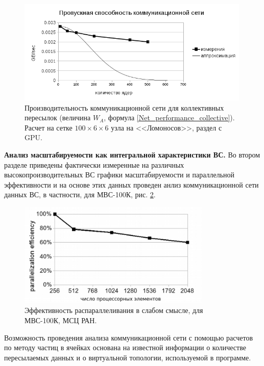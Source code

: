 \begin{figure}[h]
	
	
	\begin{center}
		\includegraphics[height=5cm,keepaspectratio]{images/W_A_Lomonosov_Gauss.png}
		\caption{
			Производительность коммуникационной сети для коллективных пересылок (величина $W_A$, формула \ref{Net_performance_collective}). Расчет на сетке $100 \times 6 \times 6$ узла на <<Ломоносов>>, раздел с GPU. 
		}
		\label{scale_W_A_Lomonosov}
	\end{center} 
\end{figure}




\textbf{Анализ масштабируемости как интегральной характеристики ВС.}
Во втором разделе приведены фактически измеренные на различных высокопроизводительных ВС графики масштабируемости и параллельной эффективности и на основе этих данных проведен анлиз коммуникационной сети данных ВС, в частности, для МВС-100К, рис. \ref{eff2}. 

\begin{figure}[h]
	\begin{center}
		\includegraphics[height=5cm,keepaspectratio]{images/eff_weak_JSCC.png}
		\caption{
			Эффективность распараллеливания в слабом смысле, для МВС-100К, МСЦ РАН.
		}
		\label{eff2}
	\end{center} 
\end{figure}

Возможность проведения анализа коммуникационной сети с помощью расчетов по методу частиц в ячейках основана на известной информации о количестве пересылаемых данных и о виртуальной топологии, используемой в программе.

